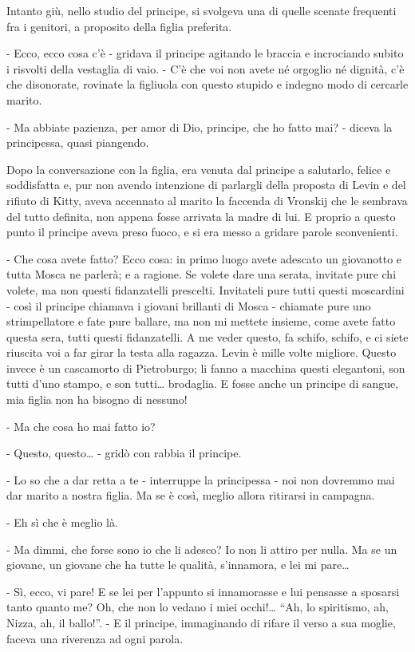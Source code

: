 Intanto giù, nello studio del principe, si svolgeva una di quelle scenate frequenti fra i genitori, a proposito della figlia preferita. 

- Ecco, ecco cosa c'è - gridava il principe agitando le braccia e incrociando subito i risvolti della vestaglia di vaio. - C'è che voi non avete né orgoglio né dignità, c'è che disonorate, rovinate la figliuola con questo stupido e indegno modo di cercarle marito. 

- Ma abbiate pazienza, per amor di Dio, principe, che ho fatto mai? - diceva la principessa, quasi piangendo. 

Dopo la conversazione con la figlia, era venuta dal principe a salutarlo, felice e soddisfatta e, pur non avendo intenzione di parlargli della proposta di Levin e del rifiuto di Kitty, aveva accennato al marito la faccenda di Vronskij che le sembrava del tutto definita, non appena fosse arrivata la madre di lui. E proprio a questo punto il principe aveva preso fuoco, e si era messo a gridare parole sconvenienti. 

- Che cosa avete fatto? Ecco cosa: in primo luogo avete adescato un giovanotto e tutta Mosca ne parlerà; e a ragione. Se volete dare una serata, invitate pure chi volete, ma non questi fidanzatelli prescelti. Invitateli pure tutti questi moscardini - così il principe chiamava i giovani brillanti di Mosca - chiamate pure uno strimpellatore e fate pure ballare, ma non mi mettete insieme, come avete fatto questa sera, tutti questi fidanzatelli. A me veder questo, fa schifo, schifo, e ci siete riuscita voi a far girar la testa alla ragazza. Levin è mille volte migliore. Questo invece è un cascamorto di Pietroburgo; li fanno a macchina questi elegantoni, son tutti d'uno stampo, e son tutti\ldots{} brodaglia. E fosse anche un principe di sangue, mia figlia non ha bisogno di nessuno! 

- Ma che cosa ho mai fatto io? 

- Questo, questo\ldots{} - gridò con rabbia il principe. 

- Lo so che a dar retta a te - interruppe la principessa - noi non dovremmo mai dar marito a nostra figlia. Ma se è così, meglio allora ritirarsi in campagna. 

- Eh sì che è meglio là. 

- Ma dimmi, che forse sono io che li adesco? Io non li attiro per nulla. Ma se un giovane, un giovane che ha tutte le qualità, s'innamora, e lei mi pare\ldots{} 

- Sì, ecco, vi pare! E se lei per l'appunto si innamorasse e lui pensasse a sposarsi tanto quanto me? Oh, che non lo vedano i miei occhi!\ldots{} ``Ah, lo spiritismo, ah, Nizza, ah, il ballo!''. - E il principe, immaginando di rifare il verso a sua moglie, faceva una riverenza ad ogni parola. 

